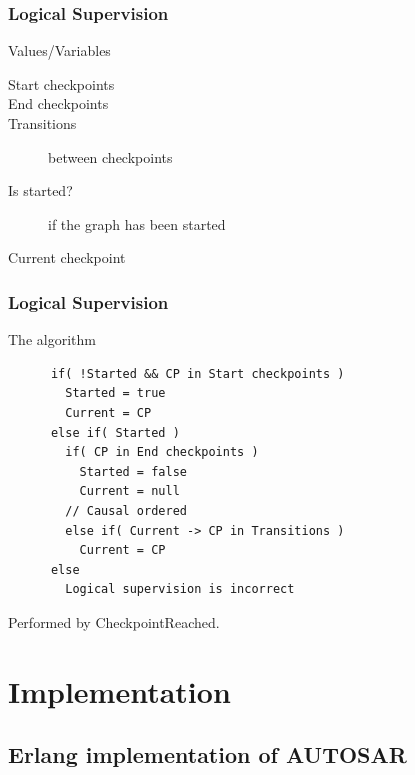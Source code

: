 \documentclass{beamer}
\begin{document}
\begin{frame}
  \frametitle{Logical Supervision}
  \begin{block}{Values/Variables}
    \begin{description}
      \item[Start checkpoints]
      \item[End checkpoints]
      \item[Transitions] between checkpoints
      \item[Is started?] if the graph has been started
      \item[Current checkpoint]
    \end{description}
  \end{block}
\end{frame}

\begin{frame}[fragile]
  \frametitle{Logical Supervision}
  \begin{block}{The algorithm}
    \begin{lstlisting}
      if( !Started && CP in Start checkpoints )
        Started = true
        Current = CP
      else if( Started )
        if( CP in End checkpoints )
          Started = false
          Current = null
        // Causal ordered
        else if( Current -> CP in Transitions )
          Current = CP
      else
        Logical supervision is incorrect
    \end{lstlisting}
  \end{block}
  Performed by CheckpointReached.
\end{frame}

\section{Implementation}


\subsection{Erlang implementation of AUTOSAR}
\end{document}
